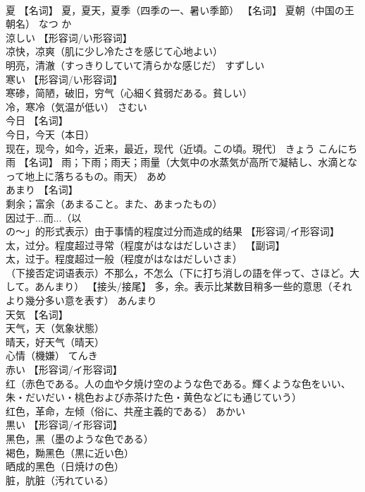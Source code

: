 \documentclass[8pt]{extreport}
\begin{document}
\begin{CJK}{UTF8}{min}
\\	夏	【名词】 夏，夏天，夏季（四季の一、暑い季節） 【名词】 夏朝（中国の王朝名）	なつ か	
\\	涼しい	【形容词/い形容词】 
\\	凉快，凉爽（肌に少し冷たさを感じて心地よい） 
\\	明亮，清澈（すっきりしていて清らかな感じだ）	すずしい	
\\	寒い	【形容词/い形容词】 
\\	寒碜，简陋，破旧，穷气（心細く貧弱だある。貧しい） 
\\	冷，寒冷（気温が低い）	さむい	
\\	今日	【名词】 
\\	今日，今天（本日） 
\\	现在，现今，如今，近来，最近，现代（近頃。この頃。現代〕	きょう こんにち	
\\	雨	【名词】 雨；下雨；雨天；雨量（大気中の水蒸気が高所で凝結し、水滴となって地上に落ちるもの。雨天）	あめ	
\\	あまり	【名词】 
\\	剩余；富余（あまること。また、あまったもの） 
\\	因过于...而...（以
\\	の～」的形式表示）由于事情的程度过分而造成的结果 【形容词/イ形容词】 太，过分。程度超过寻常（程度がはなはだしいさま） 【副词】 
\\	太，过于。程度超过一般（程度がはなはだしいさま） 
\\	（下接否定词语表示）不那么，不怎么（下に打ち消しの語を伴って、さほど。大して。あんまり） 【接头/接尾】 多，余。表示比某数目稍多一些的意思（それより幾分多い意を表す）		あんまり
\\	天気	【名词】 
\\	天气，天（気象状態） 
\\	晴天，好天气（晴天） 
\\	心情（機嫌）	てんき	
\\	赤い	【形容词/イ形容词】 
\\	红（赤色である。人の血や夕焼け空のような色である。輝くような色をいい、朱・だいだい・桃色および赤茶けた色・黄色などにも通じていう） 
\\	红色，革命，左倾（俗に、共産主義的である）	あかい	
\\	黒い	【形容词/イ形容词】 
\\	黑色，黑（墨のような色である） 
\\	褐色，黝黑色（黒に近い色） 
\\	晒成的黑色（日焼けの色） 
\\	脏，肮脏（汚れている） 

\end{CJK}
\end{document}

